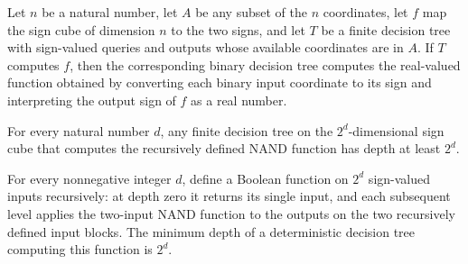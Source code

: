 \begin{theorem}
\leanok
{}
Let $n$ be a natural number, let $A$ be any subset of the $n$ coordinates, let $f$ map
the sign cube of dimension $n$ to the two signs, and let $T$ be a finite decision tree
with sign-valued queries and outputs whose available coordinates are in $A$. If $T$
computes $f$, then the corresponding binary decision tree computes the real-valued
function obtained by converting each binary input coordinate to its sign and
interpreting the output sign of $f$ as a real number.
\end{theorem}

\begin{theorem}
\label{FABL.FiniteDecisionTree.recursiveNAND_depth_le}
\leanok
{}
For every natural number $d$, any finite decision tree on the $2^d$-dimensional sign
cube that computes the recursively defined NAND function has depth at least $2^d$.
\end{theorem}

\begin{theorem}
\label{FABL.deterministicDepth_recursiveNAND}
\leanok
{}
For every nonnegative integer $d$, define a Boolean function on $2^d$ sign-valued inputs
recursively: at depth zero it returns its single input, and each subsequent level
applies the two-input NAND function to the outputs on the two recursively defined input
blocks. The minimum depth of a deterministic decision tree computing this function is
$2^d$.
\end{theorem}

